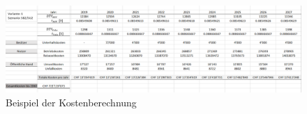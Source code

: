 \begin{figure}[h!]
	\centering
	\includegraphics[width=\textwidth]{figures/04-06-04-Kostenberechnung}
	\caption[Kostenberechnung]{Beispiel der Kostenberechnung}
	\label{img:Kostenberechnung}
\end{figure}



%

